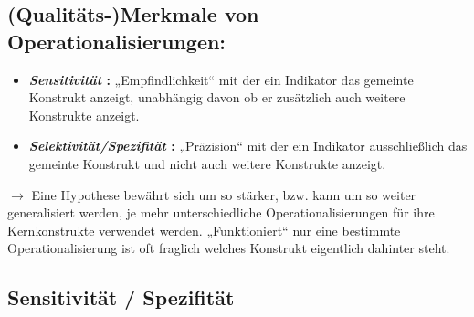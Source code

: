 \documentclass[
]{book}
\begin{document}
\hypertarget{qualituxe4ts-merkmale-von-operationalisierungen-1}{%
\subsection{(Qualitäts-)Merkmale von Operationalisierungen:}\label{qualituxe4ts-merkmale-von-operationalisierungen-1}}

\begin{itemize}
\item
  \textbf{\emph{Sensitivität} : } „Empfindlichkeit`` mit der ein Indikator das gemeinte Konstrukt anzeigt,
  unabhängig davon ob er zusätzlich auch weitere Konstrukte anzeigt.
\item
  \textbf{\emph{Selektivität/Spezifität} : } „Präzision`` mit der ein Indikator ausschließlich das gemeinte Konstrukt
  und nicht auch weitere Konstrukte anzeigt.
\end{itemize}

\(\rightarrow\) Eine Hypothese bewährt sich um so stärker, bzw. kann um so weiter generalisiert werden, je
mehr unterschiedliche Operationalisierungen für ihre Kernkonstrukte verwendet werden.
„Funktioniert`` nur eine bestimmte Operationalisierung ist oft fraglich welches Konstrukt eigentlich
dahinter steht.

\hypertarget{sensitivituxe4t-spezifituxe4t}{%
\subsection{Sensitivität / Spezifität}\label{sensitivituxe4t-spezifituxe4t}}

 
  \providecommand{\huxb}[2]{\arrayrulecolor[RGB]{#1}\global\arrayrulewidth=#2pt}
  \providecommand{\huxvb}[2]{\color[RGB]{#1}\vrule width #2pt}
  \providecommand{\huxtpad}[1]{\rule{0pt}{#1}}
  \providecommand{\huxbpad}[1]{\rule[-#1]{0pt}{#1}}
\end{document}
